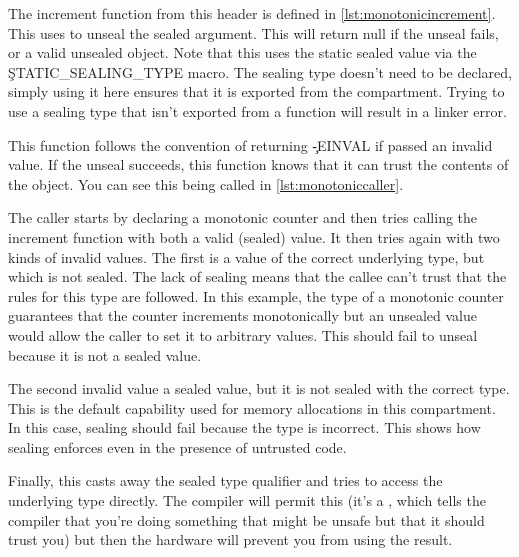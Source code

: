 \codelisting[filename=examples/software_capability/monotonic_counter.hh,marker=export,label=lst:exportmonotonic,caption="A header defining an interface using sealed objects."]{}

The increment function from this header is defined in \ref{lst:monotonicincrement}.
This uses  to unseal the sealed argument.
This will return null if the unseal fails, or a valid unsealed object.
Note that this uses the static sealed value via the \c{STATIC_SEALING_TYPE} macro.
The sealing type doesn't need to be declared, simply using it here ensures that it is exported from the compartment.
Trying to use a sealing type that isn't exported from a function will result in a linker error.

\codelisting[filename=examples/software_capability/monotonic.cc,marker=increment,label=lst:monotonicincrement,caption="The increment function for a monotonic counter."]{}

This function follows the convention of returning \c{-EINVAL} if passed an invalid value.
If the unseal succeeds, this function knows that it can trust the contents of the object.
You can see this being called in \ref{lst:monotoniccaller}.

\codelisting[filename=examples/software_capability/caller.cc,marker=entry,label=lst:monotoniccaller,caption="Calling the atomic increment function for a monotonic counter."]{}

The caller starts by declaring a monotonic counter and then tries calling the increment function with both a valid (sealed) value.
It then tries again with two kinds of invalid values.
The first is a value of the correct underlying type, but which is not sealed.
The lack of sealing means that the callee can't trust that the rules for this type are followed.
In this example, the type of a monotonic counter guarantees that the counter increments monotonically but an unsealed value would allow the caller to set it to arbitrary values.
This should fail to unseal because it is not a sealed value.

The second invalid value  a sealed value, but it is not sealed with the correct type.
This is the default capability used for memory allocations in this compartment.
In this case, sealing should fail because the type is incorrect.
This shows how sealing enforces  even in the presence of untrusted code.

Finally, this casts away the sealed type qualifier and tries to access the underlying type directly.
The compiler will permit this (it's a , which tells the compiler that you're doing something that might be unsafe but that it should trust you) but then the hardware will prevent you from using the result.

